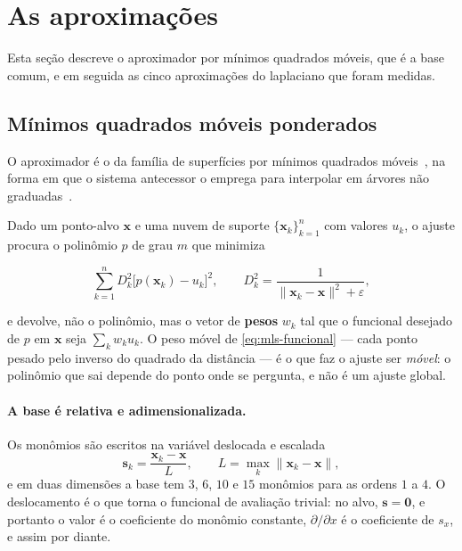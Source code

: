 \section{As aproximações}
\label{sec:aproximacoes}


Esta seção descreve o aproximador por mínimos quadrados móveis, que é a base
comum, e em seguida as cinco aproximações do laplaciano que foram medidas.

\subsection{Mínimos quadrados móveis ponderados}
\label{sec:aprox-mls}

O aproximador é o da família de superfícies por mínimos quadrados
móveis~\cite{lancaster1981}, na forma em que o sistema antecessor o emprega para
interpolar em árvores não graduadas~\cite{sousa2019}.

Dado um ponto-alvo $\mathbf{x}$ e uma nuvem de suporte $\{\mathbf{x}_k\}_{k=1}^n$
com valores $u_k$, o ajuste procura o polinômio $p$ de grau $m$ que minimiza

\begin{equation}
  \sum_{k=1}^{n} D_k^2 \bigl[p(\mathbf{x}_k) - u_k\bigr]^2,
  \qquad
  D_k^2 = \frac{1}{\|\mathbf{x}_k - \mathbf{x}\|^2 + \varepsilon},
  \label{eq:mls-funcional}
\end{equation}

e devolve, não o polinômio, mas o vetor de \textbf{pesos} $w_k$ tal que o
funcional desejado de $p$ em $\mathbf{x}$ seja $\sum_k w_k u_k$. O peso móvel de
\eqref{eq:mls-funcional} --- cada ponto pesado pelo inverso do quadrado da
distância --- é o que faz o ajuste ser \emph{móvel}: o polinômio que sai depende
do ponto onde se pergunta, e não é um ajuste global.

\paragraph{A base é relativa e adimensionalizada.} Os monômios são escritos na
variável deslocada e escalada
\begin{equation}
  \mathbf{s}_k = \frac{\mathbf{x}_k - \mathbf{x}}{L},
  \qquad
  L = \max_k \|\mathbf{x}_k - \mathbf{x}\|,
  \label{eq:mls-escala}
\end{equation}
e em duas dimensões a base tem $3$, $6$, $10$ e $15$ monômios para as ordens
$1$ a $4$. O deslocamento é o que torna o funcional de avaliação trivial: no
alvo, $\mathbf{s}=\mathbf{0}$, e portanto o valor é o coeficiente do monômio
constante, $\partial/\partial x$ é o coeficiente de $s_x$, e assim por diante.

